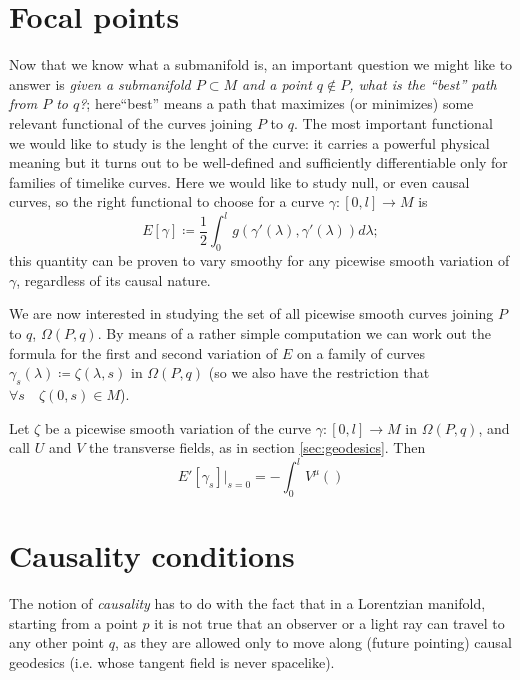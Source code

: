 \section{Focal points}
Now that we know what a submanifold is, an important question we might like to answer is \emph{given a submanifold \(P\subset M\) and a point \(q \notin P\), what is the ``best'' path from \(P\) to \(q\)?}; here``best'' means a path that maximizes (or minimizes) some relevant functional of the curves joining \(P\) to \(q\). The most important functional we would like to study is the lenght of the curve: it carries a powerful physical meaning but it turns out to be well-defined and sufficiently differentiable only for families of timelike curves. Here we would like to study null, or even causal curves, so the right functional to choose for a curve \(\gamma : [0, l] \rightarrow M\) is 
\[
E[\gamma] \coloneqq \frac{1}{2}\int_{0}^{l} g(\gamma'(\lambda), \gamma'(\lambda))d\lambda;
\]
this quantity can be proven to vary smoothy for any picewise smooth variation of \(\gamma\), regardless of its causal nature.

We are now interested in studying the set of all picewise smooth curves joining \(P\) to \(q\), \(\Omega(P, q)\). By means of a rather simple computation we can work out the formula for the first and second variation of \(E\) on a family of curves \(\gamma_s(\lambda) \coloneqq
\zeta(\lambda, s)\) in \(\Omega(P, q)\) (so we also have the restriction that \(\forall s \quad \zeta(0, s) \in M\)).

\begin{lemma}
	Let \(\zeta\) be a picewise smooth variation of the curve \(\gamma: [0, l] \rightarrow M\)  in \(\Omega(P, q)\), and call \(U\) and \(V\) the transverse fields, as in section \ref{sec:geodesics}. Then
	\[
	E'[\gamma_s]\vert_{s = 0} = - \int_{0}^{l} V^{\mu}()
	\]
	
\end{lemma}


\section{Causality conditions}

The notion of \emph{causality} has to do with the fact that in a Lorentzian manifold, starting from a  point \(p\) it is not true that an observer or a light ray can travel to any other point \(q\), as they are allowed only to move along (future pointing) causal geodesics (i.e. whose tangent field is never spacelike).


